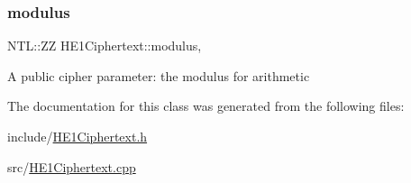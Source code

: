 \subsubsection{\texorpdfstring{modulus}{modulus}}
{\footnotesize\ttfamily N\+T\+L\+::\+ZZ H\+E1\+Ciphertext\+::modulus\hspace{0.3cm}{\ttfamily [static]}, {\ttfamily [private]}}

A public cipher parameter\+: the modulus for arithmetic 

The documentation for this class was generated from the following files\+:\begin{DoxyCompactItemize}
\item 
include/\hyperlink{HE1Ciphertext_8h}{H\+E1\+Ciphertext.\+h}\item 
src/\hyperlink{HE1Ciphertext_8cpp}{H\+E1\+Ciphertext.\+cpp}\end{DoxyCompactItemize}
